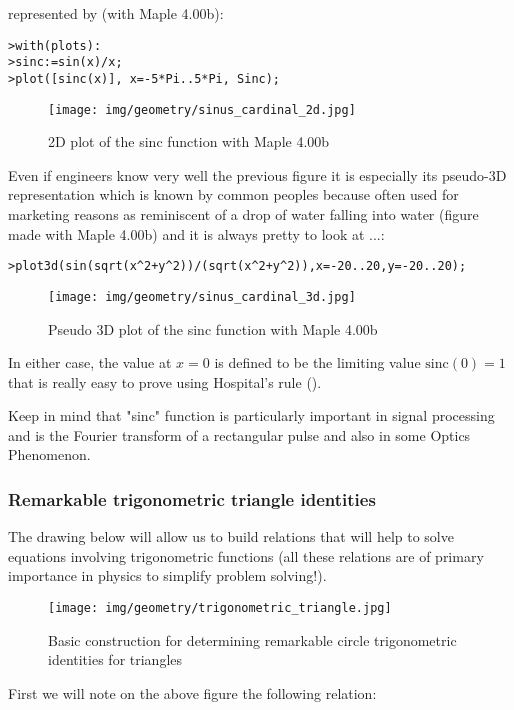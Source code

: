 	represented by (with Maple 4.00b):
	
	\texttt{>with(plots):\\
	>sinc:=sin(x)/x;\\
	>plot([sinc(x)], x=-5*Pi..5*Pi, Sinc);}
	\begin{figure}[H]
		\centering
		\texttt{[image: img/geometry/sinus\_cardinal\_2d.jpg]}
		\caption{2D plot of the sinc function with Maple 4.00b}
	\end{figure}
	Even if engineers know very well the previous figure it is especially its pseudo-3D representation which is known by common peoples because often used for marketing reasons as reminiscent of a drop of water falling into water (figure made with Maple 4.00b) and it is always pretty to look at ...:

\texttt{>plot3d(sin(sqrt(x\string^2+y\string^2))/(sqrt(x\string^2+y\string^2)),x=-20..20,y=-20..20);}

\begin{figure}[H]
\centering
\texttt{[image: img/geometry/sinus\_cardinal\_3d.jpg]}
\caption{Pseudo 3D plot of the sinc function with Maple 4.00b}
\end{figure}
In either case, the value at $x = 0$ is defined to be the limiting value $\mathrm{sinc(0)} = 1$ that is really easy to prove using Hospital's rule ().

Keep in mind that "sinc" function is particularly important in signal processing and is the Fourier transform of a rectangular pulse and also in some Optics Phenomenon.

	\subsubsection{Remarkable trigonometric triangle identities}\label{remarkable trigonometric identities}
	The drawing below will allow us to build relations that will help to solve equations involving trigonometric functions (all these relations are of primary importance in physics to simplify problem solving!).

\begin{figure}[H]
\centering
\texttt{[image: img/geometry/trigonometric\_triangle.jpg]}
\caption{Basic construction for determining remarkable circle trigonometric identities for triangles}
\end{figure}

	First we will note on the above figure the following relation:
	
